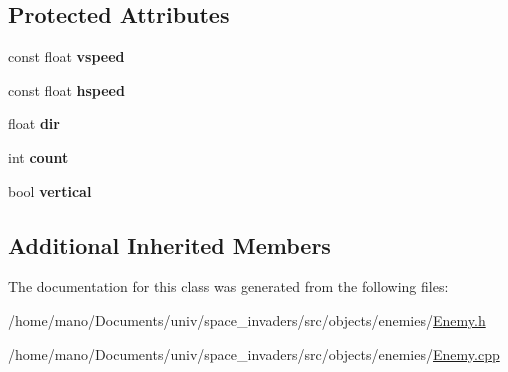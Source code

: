 \subsection*{Protected Attributes}
\begin{DoxyCompactItemize}
\item 
\mbox{\label{classobjects_1_1enemies_1_1Enemy_a2721c1375a8a67c1cb6e0c1bd5145b79}}
const float {\bfseries vspeed}
\item 
\mbox{\label{classobjects_1_1enemies_1_1Enemy_a71523230e1a995495e1079bd800101ca}}
const float {\bfseries hspeed}
\item 
\mbox{\label{classobjects_1_1enemies_1_1Enemy_a3e48faf63338b8dd57de1b197f1c4159}}
float {\bfseries dir}
\item 
\mbox{\label{classobjects_1_1enemies_1_1Enemy_a798310404e04fa3a626f9307e83e7362}}
int {\bfseries count}
\item 
\mbox{\label{classobjects_1_1enemies_1_1Enemy_ac930ca52dbc7affbd340eaac5b2a2b61}}
bool {\bfseries vertical}
\end{DoxyCompactItemize}
\subsection*{Additional Inherited Members}


The documentation for this class was generated from the following files\+:\begin{DoxyCompactItemize}
\item 
/home/mano/\+Documents/univ/space\+\_\+invaders/src/objects/enemies/\hyperlink{Enemy_8h}{Enemy.\+h}\item
/home/mano/\+Documents/univ/space\+\_\+invaders/src/objects/enemies/\hyperlink{Enemy_8cpp}{Enemy.\+cpp}\end{DoxyCompactItemize}
